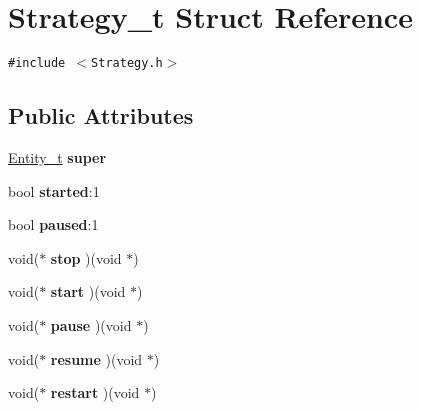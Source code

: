 \hypertarget{structStrategy__t}{
\section{Strategy\_\-t Struct Reference}
\label{structStrategy__t}
}
{\tt \#include $<$Strategy.h$>$}

\subsection*{Public Attributes}
\begin{CompactItemize}
\item 
\hypertarget{structStrategy__t_63766466eabf086d6e7085d92b7a7c6a}{
\hyperlink{structEntity__t}{Entity\_\-t} \textbf{super}}
\label{structStrategy__t_63766466eabf086d6e7085d92b7a7c6a}

\item 
\hypertarget{structStrategy__t_39f4dd341665db35739e1dbbf4e4575d}{
bool \textbf{started}:1}
\label{structStrategy__t_39f4dd341665db35739e1dbbf4e4575d}

\item 
\hypertarget{structStrategy__t_664e46b39438d57554a3968a7c8d4bd8}{
bool \textbf{paused}:1}
\label{structStrategy__t_664e46b39438d57554a3968a7c8d4bd8}

\item 
\hypertarget{structStrategy__t_38782579e4d43a54c23f485875ebfa0c}{
void($\ast$ \textbf{stop} )(void $\ast$)}
\label{structStrategy__t_38782579e4d43a54c23f485875ebfa0c}

\item 
\hypertarget{structStrategy__t_5506d6603733890574c07046dc3ff9c0}{
void($\ast$ \textbf{start} )(void $\ast$)}
\label{structStrategy__t_5506d6603733890574c07046dc3ff9c0}

\item 
\hypertarget{structStrategy__t_6aeaac77604a7b3b860b481979d88606}{
void($\ast$ \textbf{pause} )(void $\ast$)}
\label{structStrategy__t_6aeaac77604a7b3b860b481979d88606}

\item 
\hypertarget{structStrategy__t_8d731f8c2046fa3fd37855a3455ec328}{
void($\ast$ \textbf{resume} )(void $\ast$)}
\label{structStrategy__t_8d731f8c2046fa3fd37855a3455ec328}

\item 
\hypertarget{structStrategy__t_d3d024bbe533b3442b3a418d1c063ef7}{
void($\ast$ \textbf{restart} )(void $\ast$)}
\label{structStrategy__t_d3d024bbe533b3442b3a418d1c063ef7}

\end{CompactItemize}


